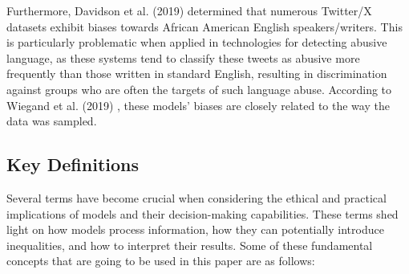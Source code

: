 \documentclass[twoside,11pt]{article}
\begin{document}
Furthermore, Davidson et al. (2019)  determined that numerous Twitter/X datasets exhibit biases towards African American English speakers/writers. This is particularly problematic when applied in technologies for detecting abusive language, as these systems tend to classify these tweets as abusive more frequently than those written in standard English, resulting in discrimination against groups who are often the targets of such language abuse. According to Wiegand et al. (2019) , these models' biases are closely related to the way the data was sampled. 

\subsection{Key Definitions}

Several terms have become crucial when considering the ethical and practical implications of models and their decision-making capabilities. These terms shed light on how models process information, how they can potentially introduce inequalities, and how to interpret their results. Some of these fundamental concepts that are going to be used in this paper are as follows:
\end{document}
